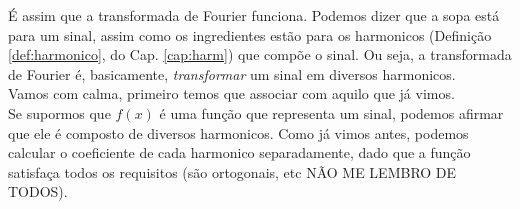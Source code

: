 É assim que a transformada de Fourier funciona. Podemos dizer que a sopa
está para um sinal, assim como os ingredientes estão para os harmonicos 
(Definição \ref{def:harmonico}, do Cap. \ref{cap:harm}) que compõe o 
sinal. Ou seja, a transformada de Fourier é, basicamente, \textit{transformar} 
um sinal em diversos harmonicos. \\

Vamos com calma, primeiro temos que associar com aquilo que já vimos.\\

Se supormos que $f(x)$ é uma função que representa um sinal, podemos 
afirmar que ele é composto de diversos harmonicos. Como já vimos antes,
podemos calcular o coeficiente de cada harmonico separadamente, dado
que a função satisfaça todos os requisitos (são ortogonais, etc NÃO ME 
LEMBRO DE TODOS).
